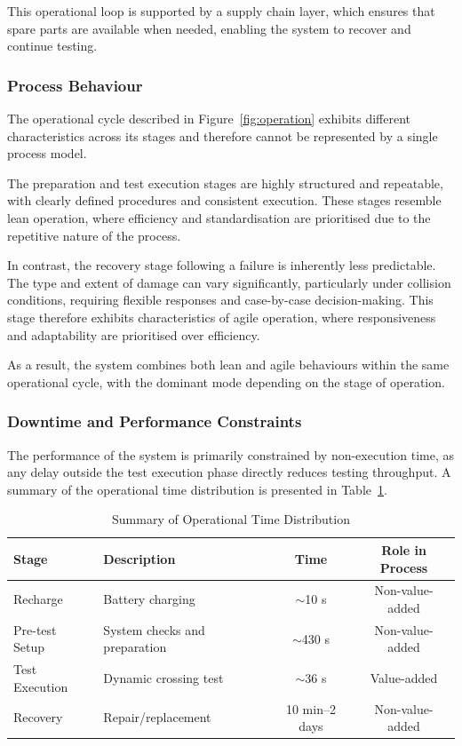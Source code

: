 \documentclass[a4paper,11pt]{article}
\begin{document}
This operational loop is supported by a supply chain layer, which ensures that spare parts are available when needed, enabling the system to recover and continue testing.

\subsubsection{Process Behaviour}

The operational cycle described in Figure~\ref{fig:operation} exhibits different characteristics across its stages and therefore cannot be represented by a single process model.

The preparation and test execution stages are highly structured and repeatable, with clearly defined procedures and consistent execution. These stages resemble lean operation, where efficiency and standardisation are prioritised due to the repetitive nature of the process.

In contrast, the recovery stage following a failure is inherently less predictable. The type and extent of damage can vary significantly, particularly under collision conditions, requiring flexible responses and case-by-case decision-making. This stage therefore exhibits characteristics of agile operation, where responsiveness and adaptability are prioritised over efficiency.

As a result, the system combines both lean and agile behaviours within the same operational cycle, with the dominant mode depending on the stage of operation.

\subsubsection{Downtime and Performance Constraints}

The performance of the system is primarily constrained by non-execution time, as any delay outside the test execution phase directly reduces testing throughput. A summary of the operational time distribution is presented in Table~\ref{tab:operation_time}.

\begin{table}[H]
\centering
\small
\renewcommand{\arraystretch}{1.5}

\caption{Summary of Operational Time Distribution}
\label{tab:operation_time}

\begin{tabularx}{\textwidth}{l X c c}
\toprule
Stage & Description & Time & Role in Process \\
\midrule
Recharge & Battery charging & $\sim$10 s & Non-value-added \\
Pre-test Setup & System checks and preparation & $\sim$430 s & Non-value-added \\
Test Execution & Dynamic crossing test & $\sim$36 s & Value-added \\
Recovery & Repair/replacement & 10 min--2 days & Non-value-added \\
\bottomrule
\end{tabularx}
\end{table}
\end{document}
